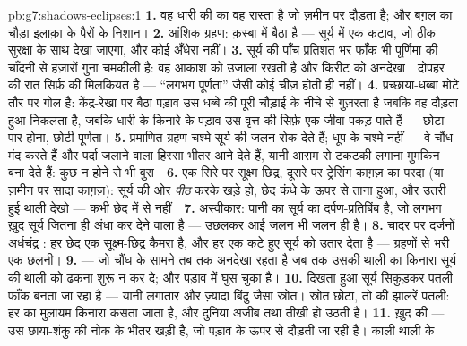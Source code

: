 \begin{solution}{pb:g7:shadows-eclipses:1}
\textbf{1.} वह धारी  की  का वह रास्ता है जो ज़मीन पर
दौड़ता है; और बग़ल का चौड़ा इलाक़ा  के पैरों के निशान।
\textbf{2.} आंशिक ग्रहण: क़स्बा  में बैठा है --- सूर्य में एक
कटाव, जो ठीक सुरक्षा के साथ देखा जाएगा, और कोई अँधेरा नहीं।
\textbf{3.} सूर्य की पाँच प्रतिशत भर फाँक भी पूर्णिमा की चाँदनी से
हज़ारों गुना चमकीली है: वह आकाश को उजाला रखती है और किरीट को अनदेखा।
दोपहर की रात सिर्फ़  की मिलकियत है --- ``लगभग पूर्णता'' जैसी
कोई चीज़ होती ही नहीं।
\textbf{4.} प्रच्छाया-धब्बा मोटे तौर पर गोल है: केंद्र-रेखा पर बैठा
पड़ाव उस धब्बे की पूरी चौड़ाई के नीचे से गुज़रता है जबकि वह दौड़ता
हुआ निकलता है, जबकि धारी के किनारे के पड़ाव उस वृत्त की सिर्फ़ एक
जीवा पकड़ पाते हैं --- छोटा पार होना, छोटी पूर्णता।
\textbf{5.} प्रमाणित ग्रहण-चश्मे सूर्य की जलन रोक देते हैं; धूप के
चश्मे नहीं --- वे चौंध मंद करते हैं और पर्दा जलाने वाला हिस्सा भीतर
आने देते हैं, यानी आराम से टकटकी लगाना मुमकिन बना देते हैं: कुछ न होने
से भी बुरा।
\textbf{6.} एक सिरे पर सूक्ष्म छिद्र, दूसरे पर ट्रेसिंग काग़ज़ का
परदा (या ज़मीन पर सादा काग़ज़): सूर्य की ओर \emph{पीठ} करके खड़े हो,
छेद कंधे के ऊपर से ताना हुआ, और उतरी हुई थाली देखो --- कभी छेद में से
नहीं।
\textbf{7.} अस्वीकार: पानी का  सूर्य का दर्पण-प्रतिबिंब है,
जो लगभग ख़ुद सूर्य जितना ही अंधा कर देने वाला है --- उछलकर आई जलन भी
जलन ही है।
\textbf{8.} चादर पर दर्जनों अर्धचंद्र : हर छेद एक
सूक्ष्म-छिद्र कैमरा है, और हर एक कटे हुए सूर्य को उतार देता है ---
ग्रहणों से भरी एक छलनी।
\textbf{9.}  --- जो चौंध के सामने तब तक अनदेखा रहता है जब तक
उसकी थाली का किनारा सूर्य की थाली को ढकना शुरू न कर दे; और पड़ाव
 में घुस चुका है।
\textbf{10.} दिखता हुआ सूर्य सिकुड़कर पतली फाँक बनता जा रहा है ---
यानी लगातार और ज़्यादा बिंदु जैसा स्रोत। स्रोत छोटा, तो  की
झालरें पतली: हर  का मुलायम किनारा कसता जाता है, और दुनिया अजीब तथा
तीखी हो उठती है।
\textbf{11.} ख़ुद  की  ---  उस छाया-शंकु की नोक
के भीतर खड़ी है, जो पड़ाव के ऊपर से दौड़ती जा रही है। काली थाली के

\end{solution}
